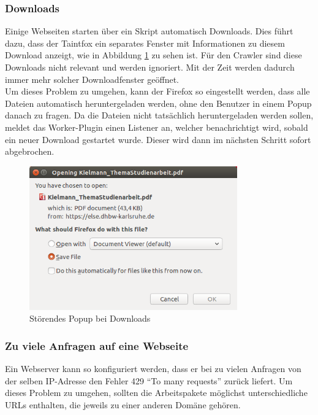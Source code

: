 \subsubsection{Downloads}
Einige Webseiten starten über ein Skript automatisch Downloads. Dies führt dazu, dass der Taintfox ein separates Fenster mit Informationen zu diesem Download anzeigt, wie in Abbildung \ref{fig:DownloadPopup} zu sehen ist. Für den Crawler sind diese Downloads nicht relevant und werden ignoriert. Mit der Zeit werden dadurch immer mehr solcher Downloadfenster geöffnet. \\
Um dieses Problem zu umgehen, kann der Firefox so eingestellt werden, dass alle Dateien automatisch heruntergeladen werden, ohne den Benutzer in einem Popup danach zu fragen. Da die Dateien nicht tatsächlich heruntergeladen werden sollen, meldet das Worker-Plugin einen Listener an, welcher benachrichtigt wird, sobald ein neuer Download gestartet wurde. Dieser wird dann im nächsten Schritt sofort abgebrochen.

\begin{figure}[h]
	\centering
	\includegraphics[width=0.8\textwidth]{Bilder/DownloadScreenshot.png}
	\caption{Störendes Popup bei Downloads}
	\label{fig:DownloadPopup}
\end{figure}

\subsubsection{Zu viele Anfragen auf eine Webseite}
Ein Webserver kann so konfiguriert werden, dass er bei zu vielen Anfragen von der selben IP-Adresse den Fehler 429 \enquote{To many requests} zurück liefert. Um dieses Problem zu umgehen, sollten die Arbeitspakete möglichst unterschiedliche URLs enthalten, die jeweils zu einer anderen Domäne gehören.

